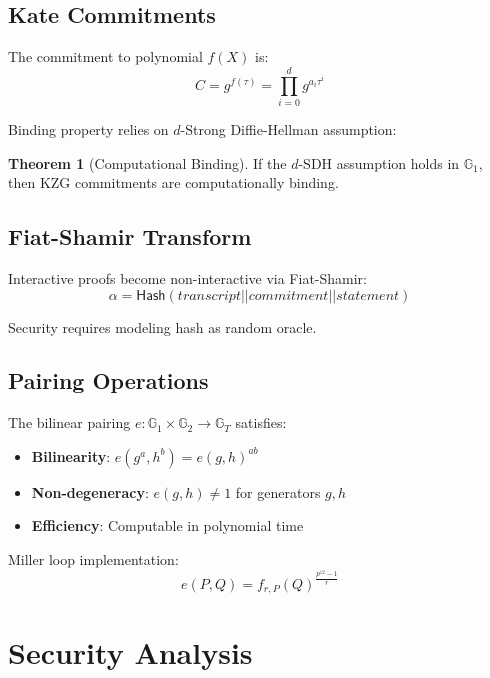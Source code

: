 \documentclass[11pt,a4paper]{article}
\theoremstyle{definition}
\newtheorem{theorem}{Theorem}
\begin{document}
\subsection{Kate Commitments}

The commitment to polynomial $f(X)$ is:
\begin{equation}
    C = g^{f(\tau)} = \prod_{i=0}^{d} g^{a_i \tau^i}
\end{equation}

Binding property relies on $d$-Strong Diffie-Hellman assumption:
\begin{theorem}[Computational Binding]
If the $d$-SDH assumption holds in $\mathbb{G}_1$, then KZG commitments are computationally binding.
\end{theorem}

\subsection{Fiat-Shamir Transform}

Interactive proofs become non-interactive via Fiat-Shamir:
\begin{equation}
    \alpha = \mathsf{Hash}(transcript || commitment || statement)
\end{equation}

Security requires modeling hash as random oracle.

\subsection{Pairing Operations}

The bilinear pairing $e: \mathbb{G}_1 \times \mathbb{G}_2 \rightarrow \mathbb{G}_T$ satisfies:
\begin{itemize}
    \item \textbf{Bilinearity}: $e(g^a, h^b) = e(g,h)^{ab}$
    \item \textbf{Non-degeneracy}: $e(g,h) \neq 1$ for generators $g,h$
    \item \textbf{Efficiency}: Computable in polynomial time
\end{itemize}

Miller loop implementation:
\begin{equation}
    e(P,Q) = f_{r,P}(Q)^{\frac{p^{12}-1}{r}}
\end{equation}

\section{Security Analysis}
\end{document}
